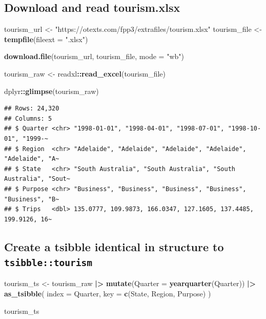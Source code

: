 \documentclass[
  11pt,
]{article}
\newenvironment{Shaded}{\begin{snugshade}}{\end{snugshade}}
\newcommand{\AttributeTok}[1]{\textcolor[rgb]{0.13,0.29,0.53}{#1}}
\newcommand{\FunctionTok}[1]{\textcolor[rgb]{0.13,0.29,0.53}{\textbf{#1}}}
\newcommand{\NormalTok}[1]{#1}
\newcommand{\OtherTok}[1]{\textcolor[rgb]{0.56,0.35,0.01}{#1}}
\newcommand{\SpecialCharTok}[1]{\textcolor[rgb]{0.81,0.36,0.00}{\textbf{#1}}}
\newcommand{\StringTok}[1]{\textcolor[rgb]{0.31,0.60,0.02}{#1}}
\begin{document}
\subsection{Download and read
tourism.xlsx}\label{download-and-read-tourism.xlsx}

\begin{Shaded}
\begin{Highlighting}[]
\NormalTok{tourism\_url }\OtherTok{\textless{}{-}} \StringTok{"https://otexts.com/fpp3/extrafiles/tourism.xlsx"}
\NormalTok{tourism\_file }\OtherTok{\textless{}{-}} \FunctionTok{tempfile}\NormalTok{(}\AttributeTok{fileext =} \StringTok{".xlsx"}\NormalTok{)}

\FunctionTok{download.file}\NormalTok{(tourism\_url, tourism\_file, }\AttributeTok{mode =} \StringTok{"wb"}\NormalTok{)}

\NormalTok{tourism\_raw }\OtherTok{\textless{}{-}}\NormalTok{ readxl}\SpecialCharTok{::}\FunctionTok{read\_excel}\NormalTok{(tourism\_file)}

\NormalTok{dplyr}\SpecialCharTok{::}\FunctionTok{glimpse}\NormalTok{(tourism\_raw)}
\end{Highlighting}
\end{Shaded}

\begin{verbatim}
## Rows: 24,320
## Columns: 5
## $ Quarter <chr> "1998-01-01", "1998-04-01", "1998-07-01", "1998-10-01", "1999-~
## $ Region  <chr> "Adelaide", "Adelaide", "Adelaide", "Adelaide", "Adelaide", "A~
## $ State   <chr> "South Australia", "South Australia", "South Australia", "Sout~
## $ Purpose <chr> "Business", "Business", "Business", "Business", "Business", "B~
## $ Trips   <dbl> 135.0777, 109.9873, 166.0347, 127.1605, 137.4485, 199.9126, 16~
\end{verbatim}

\subsection{\texorpdfstring{Create a tsibble identical in structure to
\texttt{tsibble::tourism}}{Create a tsibble identical in structure to tsibble::tourism}}\label{create-a-tsibble-identical-in-structure-to-tsibbletourism}

\begin{Shaded}
\begin{Highlighting}[]
\NormalTok{tourism\_ts }\OtherTok{\textless{}{-}}\NormalTok{ tourism\_raw }\SpecialCharTok{|\textgreater{}}
  \FunctionTok{mutate}\NormalTok{(}\AttributeTok{Quarter =} \FunctionTok{yearquarter}\NormalTok{(Quarter)) }\SpecialCharTok{|\textgreater{}}
  \FunctionTok{as\_tsibble}\NormalTok{(}
    \AttributeTok{index =}\NormalTok{ Quarter,}
    \AttributeTok{key =} \FunctionTok{c}\NormalTok{(State, Region, Purpose)}
\NormalTok{  )}

\NormalTok{tourism\_ts}
\end{Highlighting}
\end{Shaded}
\end{document}
